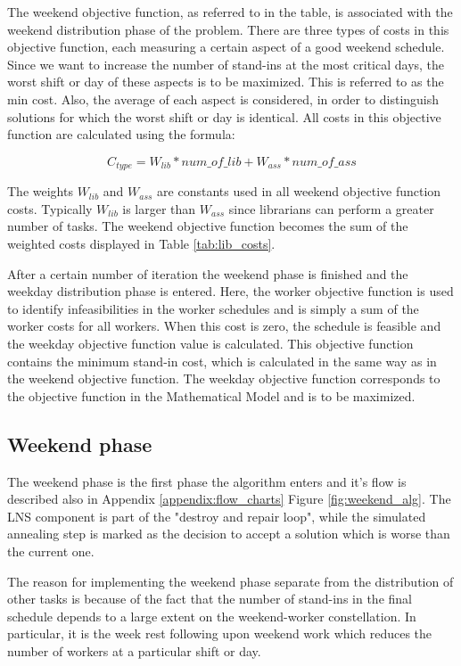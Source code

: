 The weekend objective function, as referred to in the table, is associated with the weekend distribution phase of the problem. There are three types of costs in this objective function, each measuring a certain aspect of a good weekend schedule. Since we want to increase the number of stand-ins at the most critical days, the worst shift or day of these aspects is to be maximized. This is referred to as the min cost. Also, the average of each aspect is considered, in order to distinguish solutions for which the worst shift or day is identical. All costs in this objective function are calculated using the formula:

\begin{equation}
\label{eq:wend_cost_calc}
C_{type} = W_{lib}*num\_of\_lib + W_{ass}*num\_of\_ass
\end{equation}

The weights $W_{lib}$ and $W_{ass}$ are constants used in all weekend objective function costs. Typically $W_{lib}$ is larger than $W_{ass}$ since librarians can perform a greater number of tasks. The weekend objective function becomes the sum of the weighted costs displayed in Table \ref{tab:lib_costs}. 

After a certain number of iteration the weekend phase is finished and the weekday distribution phase is entered. Here, the worker objective function is used to identify infeasibilities in the worker schedules and is simply a sum of the worker costs for all workers. When this cost is zero, the schedule is feasible and the weekday objective function value is calculated. This objective function contains the minimum stand-in cost, which is calculated in the same way as in the weekend objective function. The weekday objective function corresponds to the objective function in the Mathematical Model and is to be maximized.

\subsection{Weekend phase}

The weekend phase is the first phase the algorithm enters and it's flow is described also in Appendix \ref{appendix:flow_charts} Figure \ref{fig:weekend_alg}. The LNS component is part of the "destroy and repair loop", while the simulated annealing step is marked as the decision to accept a solution which is worse than the current one.

The reason for implementing the weekend phase separate from the distribution of other tasks is because of the fact that the number of stand-ins in the final schedule depends to a large extent on the weekend-worker constellation. In particular, it is the week rest following upon weekend work which reduces the number of workers at a particular shift or day. 


